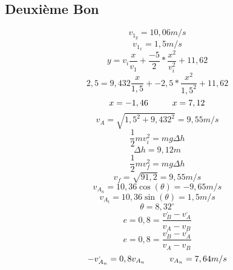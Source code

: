 \documentclass{article}
\begin{document}
\subsection{Deuxième Bon}
\begin{equation}
	v_{1_{y}} = 10,06 m/s 
\end{equation}
\begin{equation}
	v_{1_{x}} = 1,5 m/s 
\end{equation}
\begin{equation}
	y = v_{i}\frac{x}{v_{1}} + \frac{-5}{2}*\frac{x^2}{v_{i}^2} + 11,62
\end{equation}
\begin{equation}
	2,5 = 9,432\frac{x}{1,5} + -2,5*\frac{x^2}{1,5^2} + 11,62
\end{equation}
\begin{equation}
	x = -1,46  \hspace{10mm} x = 7,12
\end{equation}
\begin{equation}
	v_{A}=\sqrt{1,5^2 + 9,432^2} = 9,55 m/s
\end{equation}
\begin{equation}
	\frac{1}{2}mv_{i}^2 = mg\Delta h
\end{equation}
\begin{equation}
	\Delta h = 9,12m
\end{equation}
\begin{equation}
	\frac{1}{2}mv_{f}^2 = mg\Delta h
\end{equation}
\begin{equation}
	v_{f} = \sqrt{91,2} = 9,55 m/s
\end{equation}
\begin{equation}
	v_{A_{n}} = 10,36\cos(\theta ) = -9,65 m/s
\end{equation}
\begin{equation}
	v_{A_{t}} = 10,36\sin(\theta ) = 1,5 m/s
\end{equation}
\begin{equation}
	\theta = 8,32^{\circ}
\end{equation}
\begin{equation}
	e = 0,8 = \frac{v_{B}^,-v_{A}^,}{v_{A}-v_{B}}
\end{equation}
\begin{equation}
	e = 0,8 = \frac{v_{B}^,-v_{A}^,}{v_{A}-v_{B}}
\end{equation}
\begin{equation}
	-v_{A_{n}}^, = 0,8v_{A_{n}} 	\hspace{10mm}
	v_{A_{n}} = 7,64 m/s
\end{equation}
\end{document}
